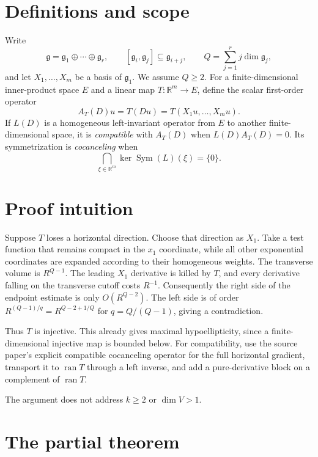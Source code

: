 \documentclass[11pt]{article}
\newcommand{\R}{\mathbb R}
\newcommand{\Sym}{\operatorname{Sym}}
\newcommand{\ran}{\operatorname{ran}}
\begin{document}
\clearpage
\section{Definitions and scope}

Write
\[
 \mathfrak g=\mathfrak g_1\oplus\cdots\oplus\mathfrak g_r,
 \qquad [\mathfrak g_i,\mathfrak g_j]\subseteq\mathfrak g_{i+j},
 \qquad Q=\sum_{j=1}^r j\dim\mathfrak g_j,
\]
and let $X_1,\ldots,X_m$ be a basis of $\mathfrak g_1$.  We assume $Q\ge2$.
For a finite-dimensional inner-product space $E$ and a linear map
$T:\R^m\to E$, define the scalar first-order operator
\begin{equation}\label{eq:AT}
 A_T(D)u=T(Du)=T(X_1u,\ldots,X_mu).
\end{equation}
If $L(D)$ is a homogeneous left-invariant operator from $E$ to another
finite-dimensional space, it is \emph{compatible} with $A_T(D)$ when
$L(D)A_T(D)=0$.  Its symmetrization is \emph{cocanceling} when
\[
 \bigcap_{\xi\in\R^m}\ker\Sym(L)(\xi)=\{0\}.
\]

\section{Proof intuition}

Suppose $T$ loses a horizontal direction.  Choose that direction as $X_1$.
Take a test function that remains compact in the $x_1$ coordinate, while all
other exponential coordinates are expanded according to their homogeneous
weights.  The transverse volume is $R^{Q-1}$.  The leading $X_1$ derivative
is killed by $T$, and every derivative falling on the transverse cutoff costs
$R^{-1}$.  Consequently the right side of the endpoint estimate is only
$O(R^{Q-2})$.  The left side is of order
$R^{(Q-1)/q}=R^{Q-2+1/Q}$ for $q=Q/(Q-1)$, giving a contradiction.

Thus $T$ is injective.  This already gives maximal hypoellipticity, since a
finite-dimensional injective map is bounded below.  For compatibility, use
the source paper's explicit compatible cocanceling operator for the full
horizontal gradient, transport it to $\ran T$ through a left inverse, and add
a pure-derivative block on a complement of $\ran T$.

The argument does not address $k\ge2$ or $\dim V>1$.

\section{The partial theorem}
\end{document}
